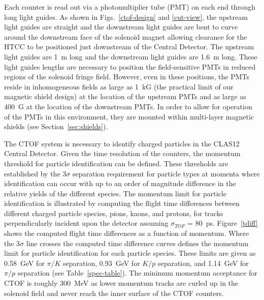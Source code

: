 \documentclass[3p,times,twocolumn]{elsarticle}
\begin{document}
Each counter is read out via a photomultiplier tube (PMT) on each end through long light guides. As shown in
Figs.~\ref{ctof-design} and \ref{cut-view}, the upstream light guides are straight and the downstream light
guides are bent to curve around the downstream face of the solenoid magnet allowing clearance for the HTCC
to be positioned just downstream of the Central Detector. The upstream light guides are 1~m long and the
downstream light guides are 1.6~m long. These light guides lengths are necessary to position the
field-sensitive PMTs in reduced regions of the solenoid fringe field. However, even in these positions, the
PMTs reside in inhomogeneous fields as large as 1~kG (the practical limit of our magnetic shield design) at
the location of the upstream PMTs and as large as 400~G at the location of the downstream PMTs. In order
to allow for operation of the PMTs in this environment, they are mounted within multi-layer magnetic shields
(see Section~\ref{sec:shields}).

The CTOF system is necessary to identify charged particles in the CLAS12 Central Detector. Given the
time resolution of the counters, the momentum threshold for particle identification can be defined. These
thresholds are established by the 3$\sigma$ separation requirement for particle types at momenta where
identification can occur with up to an order of magnitude difference in the relative yields of the different
species. The momentum limit for particle identification is illustrated by computing the flight time
differences between different charged particle species, pions, kaons, and protons, for tracks perpendicularly
incident upon the detector assuming $\sigma_{TOF}$ = 80~ps. Figure~\ref{tdiff} shows the computed flight
time differences as a function of momentum. Where the 3$\sigma$ line crosses the computed time difference
curves defines the momentum limit for particle identification for each particle species. These limits are given
as 0.58~GeV for $\pi/K$ separation, 0.93~GeV for $K/p$ separation, and 1.14~GeV for $\pi/p$ separation
(see Table~\ref{spec-table}). The minimum momentum acceptance for CTOF is roughly 300~MeV as lower
momentum tracks are curled up in the solenoid field and never reach the inner surface of the CTOF counters.
\end{document}
